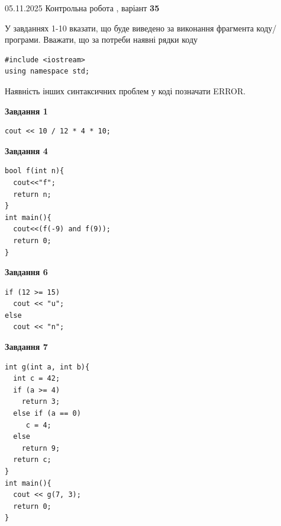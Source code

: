 \documentclass[12pt, ukrainian]{article}
\begin{document}
\newpage

{\Large{05.11.2025 Контрольна робота , варіант  \No \textbf { 35 }\par}}
{
\begin {large}
У завданнях 1-10 вказати, що буде виведено за виконання фрагмента коду/про\-гра\-ми.
Вважати, що за потреби наявні рядки коду
\begin{verbatim}
#include <iostream>
using namespace std;
\end{verbatim}
Наявність інших синтаксичних проблем у коді позначати ERROR.

\begin{minipage}[t]{7.0cm}

\begin{center}
\textbf{Завдання 1}
\end{center}
\vspace{-8mm}

\begin{verbatim}
cout << 10 / 12 * 4 * 10;
\end{verbatim}



\begin{center}
\textbf{Завдання 4}
\end{center}
\vspace{-8mm}

\begin{verbatim}
bool f(int n){
  cout<<"f";
  return n;
}
int main(){
  cout<<(f(-9) and f(9));
  return 0;
}
\end{verbatim}



\begin{center}
\textbf{Завдання 6}
\end{center}
\vspace{-8mm}

\begin{verbatim}
if (12 >= 15)
  cout << "u";
else
  cout << "n";
\end{verbatim}



\begin{center}
\textbf{Завдання 7}
\end{center}
\vspace{-8mm}

\begin{verbatim}
int g(int a, int b){
  int c = 42;
  if (a >= 4)
    return 3;
  else if (a == 0)
     c = 4;
  else
    return 9;
  return c;
}
int main(){
  cout << g(7, 3);
  return 0;
}
\end{verbatim}


\end{minipage}
\end{large}}
\end{document}
